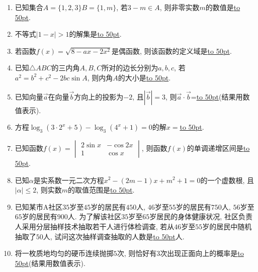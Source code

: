 \documentclass[10pt,a4paper]{article}
\newcommand{\blank}[1]{\underline{\hbox to #1pt{}}}
\begin{document}
\begin{enumerate}[1.]
\item 已知集合$A=\{1,2,3\}B=\{1,m\}$, 若$3-m\in A$, 则非零实数$m$的数值是\blank{50}.  
\item 不等式$|1-x|>1$的解集是\blank{50}.
\item 若函数$f(x)=\sqrt{8-ax-2x^2}$是偶函数, 则该函数的定义域是\blank{50}.
\item 已知$\triangle ABC$的三内角$A,B,C$所对的边长分别为$a,b,c$, 若$a^2=b^2+c^2-2bc\sin A$, 则内角$A$的大小是\blank{50}.
\item 已知向量$\overrightarrow a$在向量$\overrightarrow b$方向上的投影为$-2$, 且$|\overrightarrow b|=3$, 则$\overrightarrow a\cdot \overrightarrow b$=\blank{50}(结果用数值表示).
\item 方程$\log_3(3 \cdot 2^x+5)-\log_3(4^x+1)=0$的解$x=$\blank{50}.
\item 已知函数$f(x)=\begin{vmatrix}
2\sin x & -\cos 2x  \\ 1  & \cos x  \end{vmatrix}$, 则函数$f(x)$的单调递增区间是\blank{50}.
\item 已知$\alpha$是实系数一元二次方程$x^2-(2m-1)x+m^2+1=0$的一个虚数根, 且$|\alpha|\le 2$, 则实数$m$的取值范围是\blank{50}.
\item 已知某市A社区$35$岁至$45$岁的居民有$450$人, $46$岁至$55$岁的居民有$750$人, $56$岁至$65$岁的居民有$900$人. 为了解该社区$35$岁至$65$岁居民的身体健康状况, 社区负责人采用分层抽样技术抽取若干人进行体检调查, 若从$46$岁至$55$岁的居民中随机抽取了$50$人, 试问这次抽样调查抽取的人数是\blank{50}人.
\item 将一枚质地均匀的硬币连续抛掷$5$次, 则恰好有$3$次出现正面向上的概率是\blank{50}(结果用数值表示).



\end{enumerate}
\end{document}
